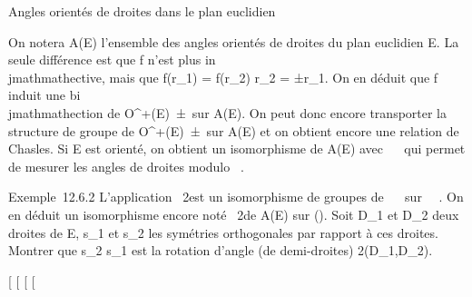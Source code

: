 \documentclass[]{article}
\begin{document}
Angles orientés de droites dans le plan euclidien

On notera A(E) l'ensemble des angles orientés de droites du plan
euclidien E. La seule différence est que f n'est plus in\\jmathmathective, mais
que f(r_1) = f(r_2) \Leftrightarrow
r_2 = ±r_1. On en déduit que f induit une bi\\jmathmathection
\tildef de O^+(E)\diagup\
±\mathrmId\ sur A(E). On peut donc
encore transporter la structure de groupe de
O^+(E)\diagup\
±\mathrmId\ sur A(E) et on obtient
encore une relation de Chasles. Si E est orienté, on obtient un
isomorphisme de A(E) avec ~\diagup\pi~ qui permet de mesurer les angles de
droites modulo \pi~.

Exemple~12.6.2 L'application \theta\mapsto~2\theta est un
isomorphisme de groupes de ~\diagup\pi~ sur ~\pi~. On en déduit un isomorphisme
encore noté \theta\mapsto~2\theta de A(E) sur
\tildeA(\mathcal{E}). Soit D_1 et D_2 deux
droites de E, s_1 et s_2 les symétries orthogonales
par rapport à ces droites. Montrer que s_2 \cdot s_1 est
la rotation d'angle (de demi-droites)
2\widehat(D_1,D_2).

{[}
{[}
{[}
{[}
\end{document}

